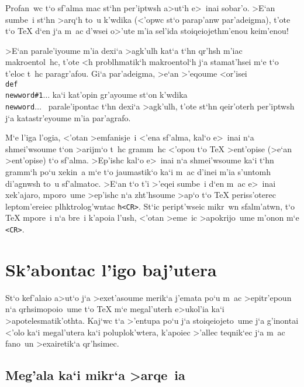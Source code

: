 \noindent
Profan~wc t`o sf'alma mac st`hn per'iptwsh a>ut`h e>~inai sobar'o.  >E`an
sumbe~i st`hn >arq`h to~u k'wdika (<'opwc st`o parap'anw par'adeigma),
t'ote t`o {\rm \TeX} d`en j`a m~ac d'wsei o>'ute m'ia sel'ida
stoiqeiojethm'enou keim'enou!

>E`an parale'iyoume m'ia dexi`a >agk'ulh kat`a t`hn qr'hsh m'iac
makroentol~hc, t'ote <h problhmatik`h makroentol`h j`a stamat'hsei m`e t`o
t'eloc t~hc paragr'afou.  Gi`a par'adeigma, >e`an >'eqou\-me <or'isei {\tt
\\def\\newword\#1\lb$\ldots$\rb} ka`i kat'opin gr'ayoume st`on k'wdika 
{\tt \\newword\lb$\dots$ } pa\-ra\-le'i\-pontac t`hn dexi`a >agk'ulh, t'ote
st`hn qeir'oterh per'iptwsh j`a katastr'eyoume m'ia par'a\-grafo.%

M`e l'iga l'ogia, <'otan >emfanisje~i <'ena sf'alma, kal`o e>~inai n`a
shmei'wsoume t`on >arijm`o t~hc gramm~hc <'opou t`o {\rm \TeX}
>ent'opise (>e`an >ent'opise) t`o sf'alma.  >Ep'ishc kal`o e>~inai n`a
shmei'wsoume ka`i t`hn gramm`h po`u xekin~a m`e t`o jaumastik`o ka`i
m~ac d'inei m'ia  s'untomh di'agnwsh to~u sf'almatoc.  >E`an t`o t'i
>'eqei sumbe~i d`en m~ac e>~inai xek'ajaro, mporo~ume >ep'ishc n`a
zht'hsoume >ap`o t`o {\rm \TeX} periss'oterec leptom'ereiec
plhktrolog'wntac {\tt h<CR>}.  St`ic peript'wseic mikr~wn sfalm'atwn,
t`o {\rm \TeX} mpore~i n`a bre~i k'apoia l'ush, <'otan >eme~ic
>apokrijo~ume m'onon m`e {\tt <CR>}.

                  
\section{Sk'abontac l'igo baj'utera}

St`o kef'alaio a>ut`o j`a >exet'asoume merik`a j'emata po`u m~ac
>epitr'epoun n`a qrhsimopoio~ume t`o {\rm \TeX} m`e megal'uterh
e>ukol'ia ka`i >apotelesmatik'othta.  Kaj`wc t`a >'entupa po`u j`a
stoiqeiojeto~ume j`a g'inontai <'olo ka`i megal'utera ka`i
poluplok'wtera, k'apoiec >'allec teqnik`ec j`a m~ac fano~un >exairetik`a
qr'hsimec. 

\subsection{Meg'ala ka`i mikr`a >arqe~ia}

